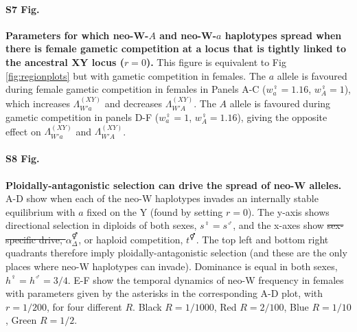 \documentclass[10pt,letterpaper]{article}
\providecommand{\DIFadd}[1]{{\protect\color{blue}\uwave{#1}}} %
\providecommand{\DIFdel}[1]{{\protect\color{red}\sout{#1}}}                      %
\providecommand{\DIFaddbegin}{} %
\providecommand{\DIFaddend}{} %
\providecommand{\DIFdelbegin}{} %
\providecommand{\DIFdelend}{} %
\begin{document}
\paragraph*{S7 Fig.}
\label{fig:regionFemaleGS}
{\bf Parameters for which neo-W-$A$ and neo-W-$a$ haplotypes spread when there is female gametic competition at a locus that is tightly linked to the ancestral XY locus ($r=0$).}
This figure is equivalent to Fig \ref{fig:regionplots} but with gametic competition in females.
The $a$ allele is favoured during female gametic competition in females in Panels A-C ($w_{a}^\female=1.16$, $w_{A}^\female=1$), which increases $\Lambda_{W'a}^{(XY)}$ and decreases $\Lambda_{W'A}^{(XY)}$. 
The $A$ allele is favoured during gametic competition in panels D-F ($w_{a}^\female=1$, $w_{A}^\female=1.16$), giving the opposite effect on $\Lambda_{W'a}^{(XY)}$ and $\Lambda_{W'A}^{(XY)}$. 

\paragraph*{S8 Fig.}
\label{fig:regionPloidAntag}
{\bf Ploidally-antagonistic selection can drive the spread of neo-W alleles. }
A-D show when each of the neo-W haplotypes invades an internally stable equilibrium with $a$ fixed on the Y (found by setting $r=0$).
The y-axis shows directional selection in diploids of both sexes, $s^\female=s^\male$, and the x-axes show \DIFdelbegin \DIFdel{sex-specific drive, $\alpha_\Delta^\Hermaphrodite$}\DIFdelend \DIFaddbegin \DIFadd{sex-limited drive, $\alpha_\Delta^\circ$}\DIFaddend , or haploid competition, \DIFdelbegin \DIFdel{$t^\Hermaphrodite$}\DIFdelend \DIFaddbegin \DIFadd{$t^\circ$}\DIFaddend .
The top left and bottom right quadrants therefore imply ploidally-antagonistic selection (and these are the only places where neo-W haplotypes can invade).
Dominance is equal in both sexes, $h^\female=h^\male=3/4$. 
E-F show the temporal dynamics of neo-W frequency in females with parameters given by the asterisks in the corresponding A-D plot, with $r=1/200$, for four different $R$.
Black $R=1/1000$, Red $R=2/100$, Blue $R=1/10$, Green $R=1/2$.  
\end{document}
